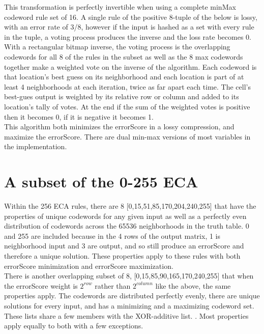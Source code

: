 \documentclass[11pt]{article}
\begin{document}
This transformation is perfectly invertible when using a complete minMax codeword rule set of 16. A single rule of the positive 8-tuple of the below is lossy, with an error rate of 3/8, however if the input is hashed as a set with every rule in the tuple, a voting process produces the inverse and the loss rate becomes 0. With a rectangular bitmap inverse, the voting process is the overlapping codewords for all 8 of the rules in the subset as well as the 8 max codewords together make a weighted vote on the inverse of the algorithm. Each codeword is that location's best guess on its neighborhood and each location is part of at least 4 neighborhoods at each iteration, twice as far apart each time. The cell's best-gues output is weighted by its relative row or column and added to its location's tally of votes. At the end if the sum of the weighted votes is positive then it becomes 0, if it is negative it becomes 1. \\

This algorithm both minimizes the errorScore in a lossy compression, and maximize the errorScore. There are dual min-max versions of most variables in the implementation. \\

\section{A subset of the 0-255 ECA}

Within the 256 ECA rules, there are 8 [0,15,51,85,170,204,240,255] that have the properties of unique codewords for any given input as well as a perfectly even distribution of codewords across the 65536 neighborhoods in the truth table. 0 and 255 are included because in the 4 rows of the output matrix, 1 is neighborhood input and 3 are output, and so still produce an errorScore and therefore a unique solution. These properties apply to these rules with both errorScore minimization and errorScore maximization. \\

There is another overlapping subset of 8, [0,15,85,90,165,170,240,255] that when the errorScore weight is $2^{row}$ rather than $2^{column}$ like the above, the same properties apply. The codewords are distributed perfectly evenly, there are unique solutions for every input, and has a minimizing and a maximizing codeword set. These lists share a few members with the XOR-additive list. \cite{xorAdditive}. Most properties apply equally to both with a few exceptions.\\
\end{document}
